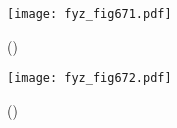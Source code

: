     \begin{figure}[ht!] %
      \centering
      \texttt{[image: fyz\_fig671.pdf]}
      \caption{
               (\cite[s.~707]{Feynman02})}
      \label{fyz_fig671}
    \end{figure}

    \begin{figure}[ht!] %
      \centering
      \texttt{[image: fyz\_fig672.pdf]}
      \caption{
               (\cite[s.~707]{Feynman02})}
      \label{fyz_fig672}
    \end{figure}

\printbibliography[title={Seznam literatury},heading=subbibliography]
